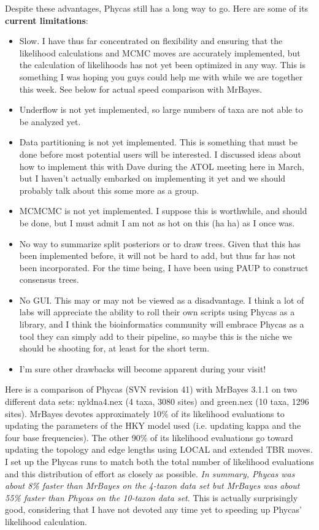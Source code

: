 \documentclass[10pt]{article}
\begin{document}
Despite these advantages, Phycas still has a long way to go. Here are some of its {\bfseries current limitations}:
\begin{itemize}
\item Slow. I have thus far concentrated on flexibility and ensuring that the likelihood calculations and MCMC moves are accurately implemented, but the calculation of likelihoods has not yet been optimized in any way. This is something I was hoping you guys could help me with while we are together this week. See below for actual speed comparison with MrBayes.
\item Underflow is not yet implemented, so large numbers of taxa are not able to be analyzed yet.
\item Data partitioning is not yet implemented. This is something that must be done before most potential users will be interested. I discussed ideas about how to implement this with Dave during the ATOL meeting here in March, but I haven't actually embarked on implementing it yet and we should probably talk about this some more as a group.
\item MCMCMC is not yet implemented. I suppose this is worthwhile, and should be done, but I must admit I am not as hot on this (ha ha) as I once was.
\item No way to summarize split posteriors or to draw trees. Given that this has been implemented before, it will not be hard to add, but thus far has not been incorporated. For the time being, I have been using PAUP to construct consensus trees.
\item No GUI. This may or may not be viewed as a disadvantage. I think a lot of labs will appreciate the ability to roll their own scripts using Phycas as a library, and I think the bioinformatics community will embrace Phycas as a tool they can simply add to their pipeline, so maybe this is the niche we should be shooting for, at least for the short term.
\item I'm sure other drawbacks will become apparent during your visit!
\end{itemize}

Here is a comparison of Phycas (SVN revision 41) with MrBayes 3.1.1 on two different data sets: nyldna4.nex (4 taxa, 3080 sites) and green.nex (10 taxa, 1296 sites). MrBayes devotes approximately 10\% of its likelihood evaluations to updating the parameters of the HKY model used (i.e. updating kappa and the four base frequencies). The other 90\% of its likelihood evaluations go toward updating the topology and edge lengths using LOCAL and extended TBR moves. I set up the Phycas runs to match both the total number of likelihood evaluations and this distribution of effort as closely as possible. {\em In summary, Phycas was about 8\% faster than MrBayes on the 4-taxon data set but MrBayes was about 55\% faster than Phycas on the 10-taxon data set}. This is actually surprisingly good, considering that I have not devoted any time yet to speeding up Phycas' likelihood calculation.
\end{document}
